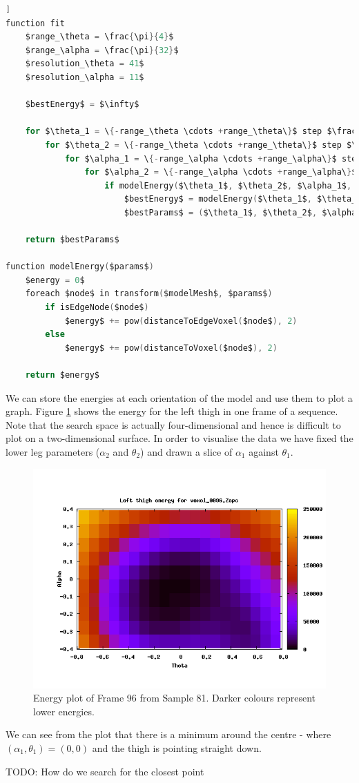 \begin{lstlisting}[language=c,morekeywords={step,function,foreach,in},frame=single,mathescape=true,caption={Least squares fitting pseudo-code},label={leastsquarescode},float=[tb]]
function fit
	$range_\theta = \frac{\pi}{4}$
	$range_\alpha = \frac{\pi}{32}$
	$resolution_\theta = 41$
	$resolution_\alpha = 11$
	
	$bestEnergy$ = $\infty$
	
	for $\theta_1 = \{-range_\theta \cdots +range_\theta\}$ step $\frac{2range_\theta}{resolution_\theta}$
		for $\theta_2 = \{-range_\theta \cdots +range_\theta\}$ step $\frac{2range_\theta}{resolution_\theta}$
			for $\alpha_1 = \{-range_\alpha \cdots +range_\alpha\}$ step $\frac{2range_\alpha}{resolution_\alpha}$
				for $\alpha_2 = \{-range_\alpha \cdots +range_\alpha\}$ step $\frac{2range_\alpha}{resolution_\alpha}$
					if modelEnergy($\theta_1$, $\theta_2$, $\alpha_1$, $\alpha_2$) < $bestEnergy$
						$bestEnergy$ = modelEnergy($\theta_1$, $\theta_2$, $\alpha_1$, $\alpha_2$)
						$bestParams$ = ($\theta_1$, $\theta_2$, $\alpha_1$, $\alpha_2$)
	
	return $bestParams$

function modelEnergy($params$)
	$energy = 0$
	foreach $node$ in transform($modelMesh$, $params$)
		if isEdgeNode($node$)
			$energy$ += pow(distanceToEdgeVoxel($node$), 2)
		else
			$energy$ += pow(distanceToVoxel($node$), 2)
	
	return $energy$
\end{lstlisting}

We can store the energies at each orientation of the model and use them to plot a graph.
Figure \ref{EnergyPlot} shows the energy for the left thigh in one frame of a sequence.
Note that the search space is actually four-dimensional and hence is difficult to plot on a two-dimensional surface.
In order to visualise the data we have fixed the lower leg parameters ($\alpha_2$ and $\theta_2$) and drawn a slice of $\alpha_1$ against $\theta_1$.

\begin{figure}[tb]
	\centering
	\includegraphics[width=\textwidth]{problems/set81frame96-fixed-leftthigh.png}
	\caption{Energy plot of Frame 96 from Sample 81.
		Darker colours represent lower energies.}
	\label{EnergyPlot}
\end{figure}

We can see from the plot that there is a minimum around the centre - where $(\alpha_1, \theta_1) = (0, 0)$ and the thigh is pointing straight down.

TODO: How do we search for the closest point

